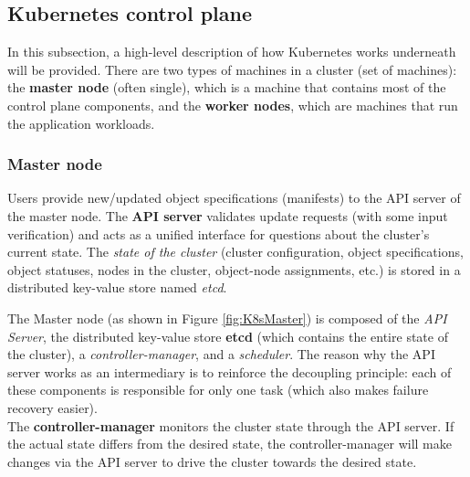 \subsection{Kubernetes control plane}

In this subsection, a high-level description of how Kubernetes works underneath will be provided. There are two types of machines in a cluster (set of machines): the \textbf{master node} (often single), which is a machine that contains most of the control plane components, and the \textbf{worker nodes}, which are machines that run the application workloads.

\subsubsection{Master node}

Users provide new/updated object specifications (manifests) to the API server of the master node. The \textbf{API server} validates update requests (with some input verification) and acts as a unified interface for questions about the cluster's current state. The \emph{state of the cluster} (cluster configuration, object specifications, object statuses, nodes in the cluster, object-node assignments, etc.) is stored in a distributed key-value store named \textit{etcd}.

The Master node (as shown in Figure \ref{fig:K8sMaster}) is composed of the \emph{API Server}, the distributed key-value store \textbf{etcd} (which contains the entire state of the cluster), a \emph{controller-manager}, and a \emph{scheduler}. The reason why the API server works as an intermediary is to reinforce the decoupling principle: each of these components is responsible for only one task (which also makes failure recovery easier).\\

The \textbf{controller-manager} monitors the cluster state through the API server. If the actual state differs from the desired state, the controller-manager will make changes via the API server to drive the cluster towards the desired state.

